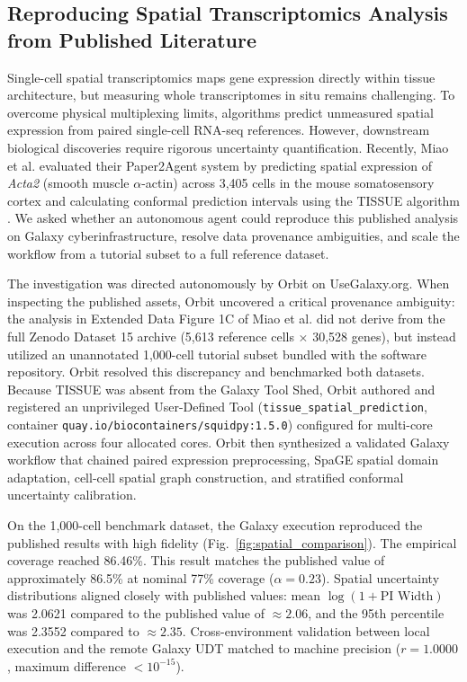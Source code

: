 \documentclass[11pt,letterpaper]{article}
\begin{document}
\subsection{Reproducing Spatial Transcriptomics Analysis from Published Literature}

Single-cell spatial transcriptomics maps gene expression directly within tissue architecture, but measuring whole transcriptomes in situ remains challenging. To overcome physical multiplexing limits, algorithms predict unmeasured spatial expression from paired single-cell RNA-seq references. However, downstream biological discoveries require rigorous uncertainty quantification. Recently, Miao et al. \cite{miao2026} evaluated their Paper2Agent system by predicting spatial expression of \textit{Acta2} (smooth muscle $\alpha$-actin) across 3,405 cells in the mouse somatosensory cortex and calculating conformal prediction intervals using the TISSUE algorithm \cite{sun2024}. We asked whether an autonomous agent could reproduce this published analysis on Galaxy cyberinfrastructure, resolve data provenance ambiguities, and scale the workflow from a tutorial subset to a full reference dataset.

The investigation was directed autonomously by Orbit on UseGalaxy.org. When inspecting the published assets, Orbit uncovered a critical provenance ambiguity: the analysis in Extended Data Figure 1C of Miao et al. \cite{miao2026} did not derive from the full Zenodo Dataset 15 archive (5,613 reference cells $\times$ 30,528 genes), but instead utilized an unannotated 1,000-cell tutorial subset bundled with the software repository. Orbit resolved this discrepancy and benchmarked both datasets. Because TISSUE was absent from the Galaxy Tool Shed, Orbit authored and registered an unprivileged User-Defined Tool (\texttt{tissue\_spatial\_prediction}, container \texttt{quay.io/biocontainers/squidpy:1.5.0}) configured for multi-core execution across four allocated cores. Orbit then synthesized a validated Galaxy workflow that chained paired expression preprocessing, SpaGE spatial domain adaptation, cell-cell spatial graph construction, and stratified conformal uncertainty calibration.

On the 1,000-cell benchmark dataset, the Galaxy execution reproduced the published results with high fidelity (Fig.~\ref{fig:spatial_comparison}). The empirical coverage reached 86.46\%. This result matches the published value of approximately 86.5\% at nominal 77\% coverage ($\alpha = 0.23$). Spatial uncertainty distributions aligned closely with published values: mean $\log(1 + \text{PI Width})$ was 2.0621 compared to the published value of $\approx 2.06$, and the 95th percentile was 2.3552 compared to $\approx 2.35$. Cross-environment validation between local execution and the remote Galaxy UDT matched to machine precision ($r = 1.0000$, maximum difference $< 10^{-15}$).
\end{document}
